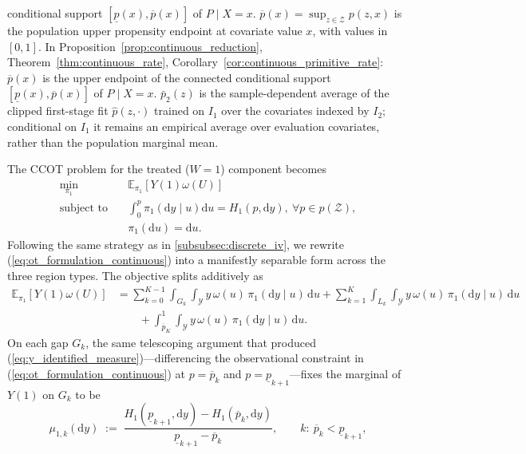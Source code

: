 conditional support $[\underline p(x),\overline p(x)]$ of $P\mid X=x$. $\overline p(x)=\sup_{z\in\mathcal Z}p(z,x)$ is the population upper propensity endpoint at covariate value $x$, with values in $[0,1]$. In Proposition~\ref{prop:continuous_reduction}, Theorem~\ref{thm:continuous_rate}, Corollary~\ref{cor:continuous_primitive_rate}: $\overline p(x)$ is the upper endpoint of the connected conditional support $[\underline p(x),\overline p(x)]$ of $P\mid X=x$. $\bar p_2(z)$ is the sample-dependent average of the clipped first-stage fit $\hat p(z,\cdot)$ trained on $I_1$ over the covariates indexed by $I_2$; conditional on $I_1$ it remains an empirical average over evaluation covariates, rather than the population marginal mean.


The CCOT problem for the treated ($W=1$) component becomes
\begin{equation}\label{eq:ot_formulation_continuous}
    \begin{split}
        \min_{\pi_1}\quad &  \mathbb{E}_{\pi_1}[Y(1)\omega(U)]  \\
        \text{subject to}  \quad &  \int_0^{p} \pi_{1}(\mathrm{d}y \mid u) \mathrm{d}u = H_1(p,\mathrm{d}y), \ \forall p \in p(\mathcal{Z}), \\
        & \pi_1(\mathrm{d}u) = \mathrm{d}u.
    \end{split}
\end{equation}
Following the same strategy as in \cref{subsubsec:discrete_iv}, we rewrite (\ref{eq:ot_formulation_continuous}) into a manifestly separable form across the three region types. The objective splits additively as
\begin{align*}
\mathbb{E}_{\pi_1}[Y(1)\omega(U)]
&= \sum_{k=0}^{K-1}\int_{G_k}\!\int_{\mathcal{Y}} y\,\omega(u)\,\pi_1(\mathrm{d}y\mid u)\,\mathrm{d}u
+ \sum_{k=1}^{K}\int_{L_k}\!\int_{\mathcal{Y}} y\,\omega(u)\,\pi_1(\mathrm{d}y\mid u)\,\mathrm{d}u \\
&\quad\quad+ \int_{\overline{p}_K}^{1}\!\int_{\mathcal{Y}} y\,\omega(u)\,\pi_1(\mathrm{d}y\mid u)\,\mathrm{d}u.
\end{align*}
On each gap $G_k$, the same telescoping argument that produced (\ref{eq:y_identified_measure})---differencing the observational constraint in (\ref{eq:ot_formulation_continuous}) at $p=\overline{p}_k$ and $p=\underline{p}_{k+1}$---fixes the marginal of $Y(1)$ on $G_k$ to be
\begin{equation}\label{eq:gap_identified_measure}
    \mu_{1,k}(\mathrm{d}y) \;:=\; \frac{H_1(\underline{p}_{k+1},\mathrm{d}y)-H_1(\overline{p}_k,\mathrm{d}y)}{\underline{p}_{k+1}-\overline{p}_k}, \qquad k:\ \overline p_k<\underline p_{k+1},
\end{equation}
